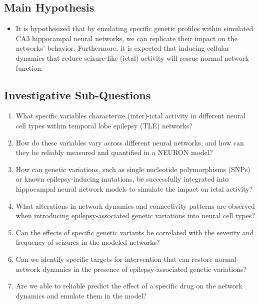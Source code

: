 \subsection*{Main Hypothesis}

\begin{itemize}
    \item It is hypothesized that by emulating specific genetic profiles within simulated CA3 hippocampal neural networks,
          we can replicate their impact on the networks' behavior. Furthermore, it is expected that inducing cellular dynamics that
          reduce seizure-like (ictal) activity will rescue normal network function.
\end{itemize}

\subsection*{Investigative Sub-Questions}

\begin{enumerate}
    \item What specific variables characterize (inter)-ictal activity in different neural cell types within temporal lobe epilepsy (TLE) networks?
    \item How do these variables vary across different neural networks, and how can they be reliably measured and quantified in a NEURON model?
    \item How can genetic variations, such as single nucleotide polymorphisms (SNPs) or known epilepsy-inducing mutations, be successfully integrated into hippocampal neural network models to simulate the impact on ictal activity?
    \item What alterations in network dynamics and connectivity patterns are observed when introducing epilepsy-associated genetic variations into neural cell types?
    \item Can the effects of specific genetic variants be correlated with the severity and frequency of seizures in the modeled networks?
    \item Can we identify specific targets for intervention that can restore normal network dynamics in the presence of epilepsy-associated genetic variations?
    \item Are we able to reliable predict the effect of a specific drug on the network dynamics and emulate them in the model?
\end{enumerate}